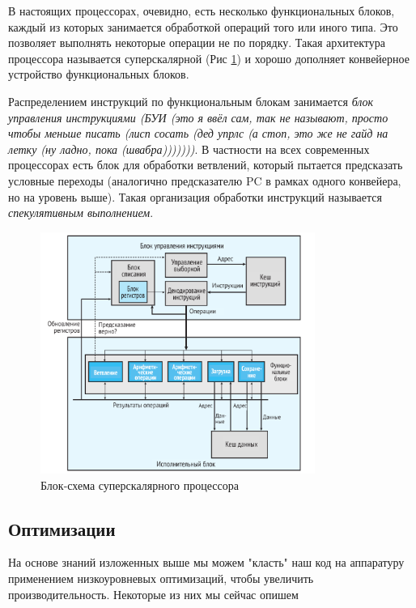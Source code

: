 \documentclass[12pt,a4paper]{article}
\begin{document}
В настоящих процессорах, очевидно, есть несколько функциональных блоков, каждый из которых занимается обработкой операций того или иного типа. Это позволяет выполнять некоторые операции не по порядку. Такая архитектура процессора называется суперскалярной (Рис \ref{fig:superscalar}) и хорошо дополняет конвейерное устройство функциональных блоков.

Распределением инструкций по функциональным блокам занимается \textit{блок управления инструкциями (БУИ (это я ввёл сам, так не называют, просто чтобы меньше писать (лисп сосать (дед упрлс (а стоп, это же не гайд на летку (ну ладно, пока (швабра)))))))}. В частности на всех современных процессорах есть блок для обработки ветвлений, который пытается предсказать условные переходы (аналогично предсказателю PC в рамках одного конвейера, но на уровень выше). Такая организация обработки инструкций называется \textit{спекулятивным выполнением}.

\begin{figure}[h!]
    \centering
    \includegraphics[width=0.8\textwidth]{supscalar.png}
    \caption{Блок-схема суперскалярного процессора}
    \label{fig:superscalar}
\end{figure}


\subsection{Оптимизации}

На основе знаний изложенных выше мы можем "класть" наш код на аппаратуру применением низкоуровневых оптимизаций, чтобы увеличить производительность. Некоторые из них мы сейчас опишем
\end{document}
